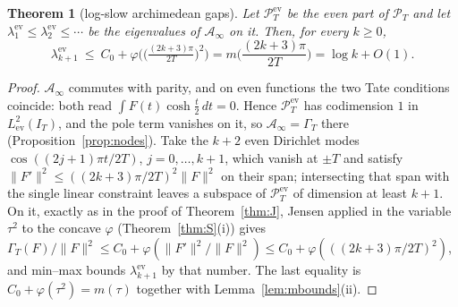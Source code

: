 \documentclass[11pt]{amsart}
\newtheorem{theorem}{Theorem}[section]
\theoremstyle{definition}
\theoremstyle{remark}
\newcommand{\PT}{\mathcal P_T}
\newcommand{\IT}{I_T}
\newcommand{\Ainf}{\mathcal A_\infty}
\begin{document}
\begin{theorem}[log-slow archimedean gaps]\label{thm:arena}
Let $\PT^{\mathrm{ev}}$ be the even part of $\PT$ and let
$\lambda^{\mathrm{ev}}_1\le\lambda^{\mathrm{ev}}_2\le\cdots$ be the eigenvalues of $\Ainf$ on it.
Then, for every $k\ge0$,
\[
\lambda^{\mathrm{ev}}_{k+1}\ \le\ C_0+\varphi\Big(\big(\tfrac{(2k+3)\pi}{2T}\big)^2\Big)
=m\Big(\frac{(2k+3)\pi}{2T}\Big)=\log k+O(1).
\]
\end{theorem}
\begin{proof}
$\Ainf$ commutes with parity, and on even functions the two Tate conditions coincide: both read
$\int F(t)\cosh\frac t2\,dt=0$. Hence $\PT^{\mathrm{ev}}$ has codimension $1$ in
$L^2_{\mathrm{ev}}(\IT)$, and the pole term vanishes on it, so $\Ainf=\Gamma_T$ there
(Proposition~\ref{prop:nodes}). Take the $k+2$ even Dirichlet modes $\cos((2j+1)\pi t/2T)$,
$j=0,\dots,k+1$, which vanish at $\pm T$ and satisfy
$\|F'\|^2\le((2k+3)\pi/2T)^2\|F\|^2$ on their span; intersecting that span with the single linear
constraint leaves a subspace of $\PT^{\mathrm{ev}}$ of dimension at least $k+1$. On it, exactly as
in the proof of Theorem~\ref{thm:J}, Jensen applied in the variable $\tau^2$ to the concave
$\varphi$ (Theorem~\ref{thm:S}(i)) gives
$\Gamma_T(F)/\|F\|^2\le C_0+\varphi(\|F'\|^2/\|F\|^2)\le C_0+\varphi(((2k+3)\pi/2T)^2)$, and
min--max bounds $\lambda^{\mathrm{ev}}_{k+1}$ by that number. The last equality is
$C_0+\varphi(\tau^2)=m(\tau)$ together with Lemma~\ref{lem:mbounds}(ii).
\end{proof}
\end{document}
